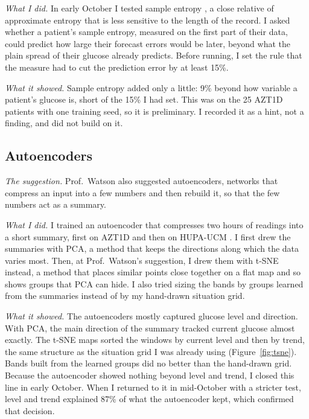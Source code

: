 \textit{What I did.} In early October I tested sample entropy \parencite{richman2000sampen}, a close relative of approximate entropy that is less sensitive to the length of the record. I asked whether a patient's sample entropy, measured on the first part of their data, could predict how large their forecast errors would be later, beyond what the plain spread of their glucose already predicts. Before running, I set the rule that the measure had to cut the prediction error by at least 15\%.

\textit{What it showed.} Sample entropy added only a little: 9\% beyond how variable a patient's glucose is, short of the 15\% I had set. This was on the 25 AZT1D patients with one training seed, so it is preliminary. I recorded it as a hint, not a finding, and did not build on it.

\subsection{Autoencoders}

\textit{The suggestion.} Prof.\ Watson also suggested autoencoders, networks that compress an input into a few numbers and then rebuild it, so that the few numbers act as a summary.

\textit{What I did.} I trained an autoencoder that compresses two hours of readings into a short summary, first on AZT1D and then on HUPA-UCM \parencite{hupa2024}. I first drew the summaries with PCA, a method that keeps the directions along which the data varies most. Then, at Prof.\ Watson's suggestion, I drew them with t-SNE instead, a method that places similar points close together on a flat map and so shows groups that PCA can hide. I also tried sizing the bands by groups learned from the summaries instead of by my hand-drawn situation grid.

\textit{What it showed.} The autoencoders mostly captured glucose level and direction. With PCA, the main direction of the summary tracked current glucose almost exactly. The t-SNE maps sorted the windows by current level and then by trend, the same structure as the situation grid I was already using (Figure~\ref{fig:tsne}). Bands built from the learned groups did no better than the hand-drawn grid. Because the autoencoder showed nothing beyond level and trend, I closed this line in early October. When I returned to it in mid-October with a stricter test, level and trend explained 87\% of what the autoencoder kept, which confirmed that decision.

